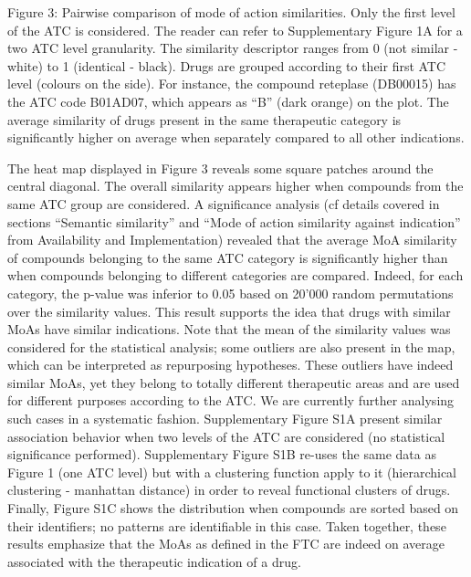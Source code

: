 \documentclass{bioinfo}
\begin{document}
Figure 3: Pairwise comparison of mode of action similarities. Only the first level of 
the ATC is considered. The reader can refer to Supplementary Figure 1A for a two ATC level granularity. 
The similarity descriptor ranges from 0 (not similar - white) to 1 (identical - black). Drugs are grouped according 
to their first ATC level (colours on the side). For instance, the compound reteplase (DB00015) has the ATC code B01AD07, 
which appears as “B” (dark orange) on the plot. The average similarity of drugs present in the same therapeutic category 
is significantly higher on average when separately compared to all other indications.
 
The heat map displayed in Figure 3 reveals some square patches around the central diagonal. 
The overall similarity appears higher when compounds from the same ATC group are considered. 
A significance analysis (cf details covered in sections “Semantic similarity” 
and “Mode of action similarity against indication” from Availability and Implementation) 
revealed that the average MoA similarity of compounds belonging to the same ATC category is 
significantly higher than when compounds belonging to different categories are compared. Indeed, for 
each category, the p-value was inferior to 0.05 based on 20’000 random permutations over the similarity values. 
This result supports the idea that drugs with similar MoAs have similar indications. Note that the mean of the 
similarity values was considered for the statistical analysis; some outliers are also present in the map, which 
can be interpreted as repurposing hypotheses. These outliers have indeed similar MoAs, yet they belong to totally 
different therapeutic areas and are used for different purposes according to the ATC. We are currently further analysing 
such cases in a systematic fashion. Supplementary Figure S1A present similar association behavior when two levels of the ATC are 
considered (no statistical significance performed). Supplementary Figure S1B re-uses the same data as Figure 1 (one ATC level) 
but with a clustering function apply to it (hierarchical clustering - manhattan distance) in order to reveal 
functional clusters of drugs. Finally, Figure S1C shows the distribution when compounds are sorted based on 
their identifiers; no patterns are identifiable in this case. Taken together, these results emphasize that the MoAs as 
defined in the FTC are indeed on average associated with the therapeutic indication of a drug.
 
\end{document}
